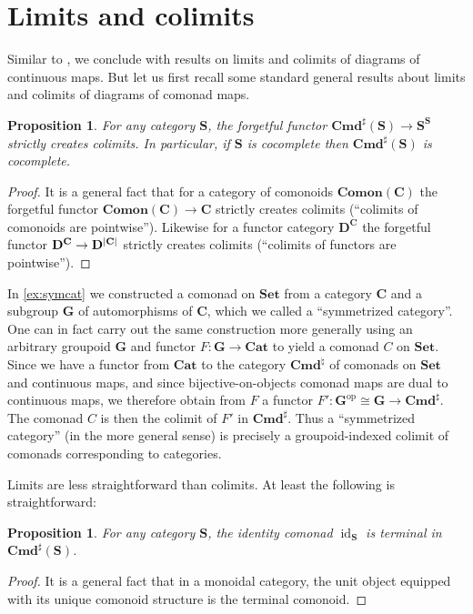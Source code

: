 \documentclass[11pt, oneside, article]{memoir}
\theoremstyle{plain}
\newtheorem{proposition}[theorem]{Proposition}
\theoremstyle{definition}
\theoremstyle{remark}
\newenvironment{example}
{\renewcommand\qedsymbol{$\lrcorner$}%
  \pushQED{\qed}\myexample}
{\popQED\endmyexample}
\DeclareMathOperator{\id}{id}
\DeclareMathOperator{\ophelper}{op}
\DeclarePairedDelimiter{\abs}{\lvert}{\rvert}
\newcommand{\op}{^{\ophelper}}
\newcommand{\namedcat}[1]{\mathbf{#1}}
\newcommand{\cat}[1]{\mathbf{#1}}
\newcommand{\Set}{\namedcat{Set}}
\newcommand{\Cat}{\namedcat{Cat}}
\newcommand{\Com}{\namedcat{Cmd}^\sharp}
\newcommand{\ComSet}{\Com}
\newcommand{\Con}{\namedcat{Cmd}^\natural}
\newcommand{\ConSet}{\Con}
\newcommand{\Comon}[1]{\mathbf{Comon}(#1)}
\newcommand{\pts}[1]{{\abs{#1}}}
\newcommand{\obs}[1]{\pts{#1}}
\newcommand{\fun}[2]{{#2}^{#1}}
\newcommand{\End}[1]{\fun{#1}{#1}}
\newcommand{\cmnd}[1]{{#1}}
\newcommand{\cC}{\cmnd{C}}
\newcommand{\bC}{\cat{C}}
\newcommand{\bD}{\cat{D}}
\newcommand{\bG}{\cat{G}}
\newcommand{\bS}{\cat{S}}
\begin{document}
\section{Limits and colimits}\label{sec:limits}

Similar to \cite[Section 6]{garner:ionads}, we conclude with results
on limits and colimits of diagrams of continuous maps. But let us
first recall some standard general results about limits and colimits
of diagrams of comonad maps.


\begin{proposition}\label{prop:comoncolim}
  For any category $\bS$, the forgetful functor $\Com(\bS) \to \End{\bS}$
  strictly creates colimits. In particular, if $\bS$ is cocomplete then
  $\Com(\bS)$ is cocomplete.
\end{proposition}
\begin{proof}
  It is a general fact that for a category of comonoids $\Comon{\bC}$
  the forgetful functor $\Comon{\bC} \to \bC$ strictly creates
  colimits (``colimits of comonoids are pointwise''). Likewise for a
  functor category $\bD^\bC$ the forgetful functor
  $\bD^\bC \to \bD^{\obs{\bC}}$ strictly creates colimits (``colimits
  of functors are pointwise'').
\end{proof}

\begin{example}
  In \cref{ex:symcat} we constructed a comonad on $\Set$ from a
  category $\bC$ and a subgroup $\bG$ of automorphisms of $\bC$, which
  we called a ``symmetrized category''. One can in fact carry out the
  same construction more generally using an arbitrary groupoid $\bG$
  and functor $F \colon \bG \to \Cat$ to yield a comonad $\cC$ on
  $\Set$. Since we have a functor from $\Cat$ to the category
  $\ConSet$ of comonads on $\Set$ and continuous maps, and since
  bijective-on-objects comonad maps are dual to continuous maps, we
  therefore obtain from $F$ a functor
  $F' \colon \bG\op \cong \bG \to \ComSet$. The comonad $\cC$ is then
  the colimit of $F'$ in $\ComSet$. Thus a ``symmetrized category''
  (in the more general sense) is precisely a groupoid-indexed colimit
  of comonads corresponding to categories.
\end{example}

Limits are less straightforward than colimits. At least the following
is straightforward:

\begin{proposition}
  For any category $\bS$, the identity comonad $\id_{\bS}$ is terminal in
  $\Com(\bS)$.
\end{proposition}
\begin{proof}
  It is a general fact that in a monoidal category, the unit object
  equipped with its unique comonoid structure is the terminal
  comonoid.
\end{proof}
\end{document}

